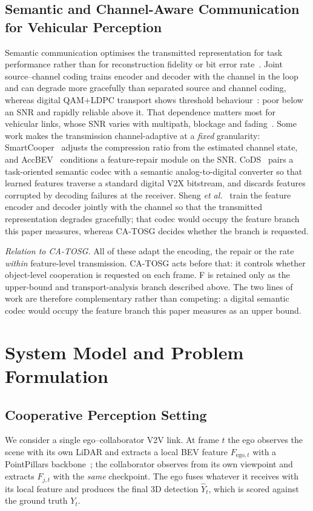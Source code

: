 \documentclass[journal]{IEEEtran}
\newcommand{\method}{CA-TOSG}
\begin{document}
\subsection{Semantic and Channel-Aware Communication for Vehicular Perception}
Semantic communication optimises the transmitted representation for task performance rather than for
reconstruction fidelity or bit error
rate~\cite{sheng2024importance,gan2026scomcp,bourtsoulatze2019deepjscc,xie2021deepsc,gunduz2023beyond}.
Joint source--channel coding trains encoder and decoder with the channel in the loop and can degrade
more gracefully than separated source and channel coding, whereas digital QAM$+$LDPC transport shows
threshold behaviour~\cite{ieee80211bd}: poor below an SNR and rapidly reliable above it. That
dependence matters most for vehicular links, whose SNR varies with multipath, blockage and
fading~\cite{3gpp37885}. Some work makes the transmission channel-adaptive at a \emph{fixed}
granularity: SmartCooper~\cite{zhang2024smartcooper} adjusts the compression ratio from the estimated
channel state, and AccBEV~\cite{accbev2025} conditions a feature-repair module on the SNR.
CoDS~\cite{gan2025cods} pairs a task-oriented semantic codec with a semantic analog-to-digital
converter so that learned features traverse a standard digital V2X bitstream, and discards features
corrupted by decoding failures at the receiver. Sheng \emph{et al.}~\cite{sheng2026tccn} train the
feature encoder and decoder jointly with the channel so that the transmitted representation degrades
gracefully; that codec would occupy the feature branch this paper measures, whereas \method{}
decides whether the branch is requested.

\emph{Relation to \method{}.} All of these adapt the encoding, the repair or the rate \emph{within}
feature-level transmission. \method{} acts before that: it controls whether object-level
cooperation is requested on each frame. F is retained only as the upper-bound and
transport-analysis branch described above. The two lines of work are therefore complementary rather
than competing: a digital semantic codec would occupy the feature branch this paper measures as an
upper bound.

\section{System Model and Problem Formulation}\label{sec:system}

\subsection{Cooperative Perception Setting}
We consider a single ego--collaborator V2V link. At frame $t$ the ego observes the scene with its
own LiDAR and extracts a local BEV feature $F_{\mathrm{ego},t}$ with a PointPillars
backbone~\cite{lang2019pointpillars}; the collaborator observes from its own viewpoint and extracts
$F_{j,t}$ with the \emph{same} checkpoint. The ego fuses whatever it receives with its local feature
and produces the final 3D detection $\hat Y_t$, which is scored against the ground truth $Y_t$.
\end{document}
